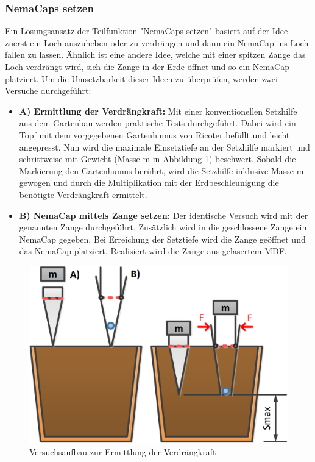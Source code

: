 \subsubsection{NemaCaps setzen}
Ein Lösungsansatz der Teilfunktion "NemaCaps setzen" basiert auf der Idee zuerst ein Loch auszuheben oder zu verdrängen und dann ein NemaCap ins Loch fallen zu lassen. Ähnlich ist eine andere Idee, welche mit einer spitzen Zange das Loch verdrängt wird, sich die Zange in der Erde öffnet und so ein NemaCap platziert.
\newline
Um die Umsetzbarkeit dieser Ideen zu überprüfen, werden zwei Versuche durchgeführt:
\begin{itemize}
	\item \textbf{A) Ermittlung der Verdrängkraft:} Mit einer konventionellen Setzhilfe aus dem Gartenbau werden praktische Tests durchgeführt. Dabei wird ein Topf mit dem vorgegebenen Gartenhumus von Ricoter befüllt und leicht angepresst. Nun wird die maximale Einsetztiefe an der Setzhilfe markiert und schrittweise mit Gewicht (Masse m in Abbildung \ref{fig:skizze_setzversuch}) beschwert. Sobald die Markierung den Gartenhumus berührt, wird die Setzhilfe inklusive Masse m gewogen und durch die Multiplikation mit der Erdbeschleunigung die benötigte Verdrängkraft ermittelt.
	
	\item \textbf{B) NemaCap mittels Zange setzen:} Der identische Versuch wird mit der genannten Zange durchgeführt. Zusätzlich wird in die geschlossene Zange ein NemaCap gegeben. Bei Erreichung der Setztiefe wird die Zange geöffnet und das NemaCap platziert. Realisiert wird die Zange aus gelasertem MDF.
\end{itemize} 

\begin{figure}[H]
	\includegraphics[width=1\textwidth]{Illustrationen/5-Konzept/skizze_stechversuch.PNG}
	\caption{Versuchsaufbau zur Ermittlung der Verdrängkraft}
	\label{fig:skizze_setzversuch}
\end{figure}


